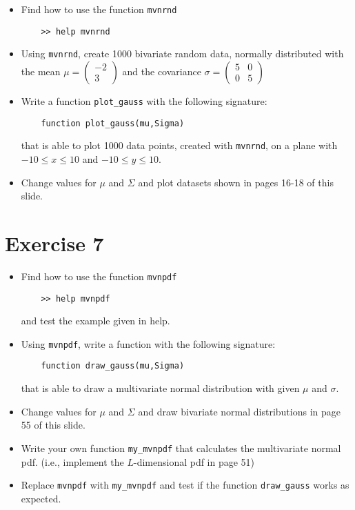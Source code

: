 \documentclass{article}
\begin{document}
\begin{itemize}

\item Find how to use the function \texttt{mvnrnd}
%
\begin{verbatim}
    >> help mvnrnd
\end{verbatim}

\item Using \texttt{mvnrnd}, create 1000 bivariate random data, normally distributed with the mean 
$\mu = \left( \begin{matrix} -2 \\ 3 \end{matrix}\right)$
and the covariance  $\sigma = \left( \begin{matrix} 5 & 0 \\ 0 & 5 \end{matrix}\right)$

\item Write a function \texttt{plot\_gauss} with the following signature:
%
\begin{verbatim} 
    function plot_gauss(mu,Sigma)
\end{verbatim}
%
that is able to plot 1000 data points, created with \texttt{mvnrnd}, on a plane with 
$-10 \le x \le 10$ and $-10 \le y \le 10$. 

\item Change values for $\mu$ and $\Sigma$ and plot datasets shown in pages 16-18 of this slide.

\end{itemize}

\section*{Exercise 7}

\begin{itemize}

\item Find how to use the function \texttt{mvnpdf}
%
\begin{verbatim}
    >> help mvnpdf
\end{verbatim}
%
and test the example given in help.

\item Using \texttt{mvnpdf}, write a function with the following signature:
%
\begin{verbatim}
    function draw_gauss(mu,Sigma)
\end{verbatim}
%
that is able to draw a multivariate normal distribution with given $\mu$ and $\sigma$.

\item Change values for $\mu$ and $\Sigma$ and draw bivariate normal distributions in page 55 of this slide.

\item Write your own function \texttt{my\_mvnpdf} that calculates the multivariate normal pdf. (i.e., implement the $L$-dimensional pdf in page 51)

\item Replace \texttt{mvnpdf} with \texttt{my\_mvnpdf} and test if the function \texttt{draw\_gauss} works as expected.

\end{itemize}
\end{document}

